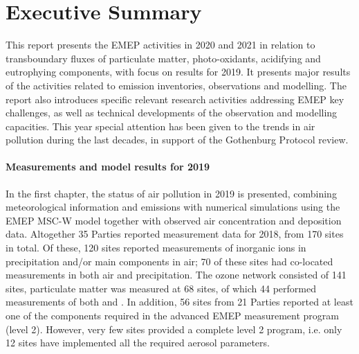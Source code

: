 \chapter*{Executive Summary}


This report presents the EMEP activities in 2020 and 2021 in relation to transboundary
fluxes of particulate matter, photo-oxidants, acidifying and
eutrophying components, with focus on results
for 2019. It presents major results of the activities related to
emission inventories, observations and modelling. The report also
introduces specific relevant research activities addressing EMEP key
challenges, as well as technical developments of the observation and
modelling capacities. This year special attention has been given to the trends in air pollution during the last decades, in support of the Gothenburg Protocol review.

\subsubsection*{Measurements and model results for 2019} %
In the first chapter, the status of air pollution in 2019 is presented, combining 
meteorological information and emissions with numerical simulations using the EMEP MSC-W model together with observed air concentration and deposition data.
Altogether 35 Parties reported measurement data for 2018, from 170 sites in total. 
Of these, 120 sites reported measurements of inorganic ions in precipitation and/or 
main components in air; 70 of these sites had co-located measurements in both air and 
precipitation. The ozone network consisted of 141 sites, particulate matter was measured at 
68 sites, of which 44 performed measurements of both \PM[10] and \PM[2.5]. 
In addition, 56 sites from 21 Parties reported at least one of the components required in the advanced EMEP measurement program (level 2). However, very few sites provided a complete level 2 program, i.e. only 12 sites have implemented all the required aerosol parameters. 

